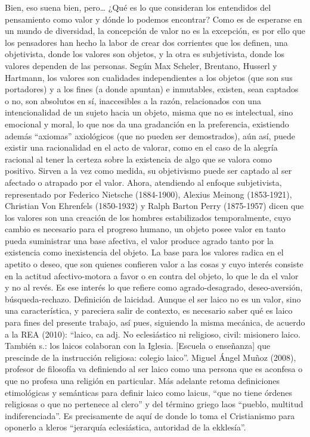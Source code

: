 Bien, eso suena bien, pero… ¿Qué es lo que consideran los entendidos del pensamiento como valor y dónde lo podemos encontrar? Como es de esperarse en un mundo de diversidad, la concepción de valor no es la excepción, es por ello que los pensadores han hecho la labor de crear dos corrientes que los definen, una objetivista, donde los valores son objetos, y la otra es subjetivista, donde los valores dependen de las personas. Según Max Scheler, Brentano, Husserl y Hartmann, los valores son cualidades independientes a los objetos (que son sus portadores) y a los fines (a donde apuntan) e inmutables, existen, sean captados o no, son absolutos en sí, inaccesibles a la razón, relacionados con una intencionalidad de un sujeto hacia un objeto, misma que no es intelectual, sino emocional y moral, lo que nos da una gradanción en la preferencia, existiendo además “axiomas” axiológicos (que no pueden ser demostrados), aún así, puede existir una racionalidad en el acto de valorar, como en el caso de la alegría racional al tener la certeza sobre la existencia de algo que se valora como positivo. Sirven a la vez como medida, su objetivismo puede ser captado al ser afectado o atrapado por el valor. Ahora, atendiendo al enfoque subjetivista, representado por Federico Nietsche (1884-1900), Alexius Meinong (1853-1921), Christian Von Ehrenfels (1850-1932) y Ralph Barton Perry (1875-1957) dicen que los valores son una creación de los hombres estabilizados temporalmente, cuyo cambio es necesario para el progreso humano, un objeto posee valor en tanto pueda suministrar una base afectiva, el valor produce agrado tanto por la existencia como inexistencia del objeto. La base para los valores radica en el apetito o deseo, que son quienes confieren valor a las cosas y cuyo interés consiste en la actitud afectivo-motora a favor o en contra del objeto, lo que le da el valor y no al revés. Es ese interés lo que refiere como agrado-desagrado, deseo-aversión, búsqueda-rechazo.
Definición de laicidad.
Aunque el ser laico no es un valor, sino una característica, y pareciera salir de contexto, es necesario saber qué es laico para fines del presente trabajo, así pues, siguiendo la misma mecánica, de acuerdo a la REA (2010): “laico, ca adj. No eclesiástico ni religioso, civil: misionero laico. También s.: los laicos colaboran con la Iglesia. [Escuela o enseñanza] que prescinde de la instrucción religiosa: colegio laico”.
Miguel Ángel Muñoz (2008), profesor de filosofía va definiendo al ser laico como una persona que es aconfesa o que no profesa una religión en particular. Más adelante retoma definiciones etimológicas y semánticas para definir laico como laicus, “que no tiene órdenes religiosas o que no pertenece al clero” y del término griego laos “pueblo, multitud indiferenciada”. Es precisamente de aquí de donde lo toma el Cristianismo para oponerlo a kleros “jerarquía eclesiástica, autoridad de la ekklesía”.
